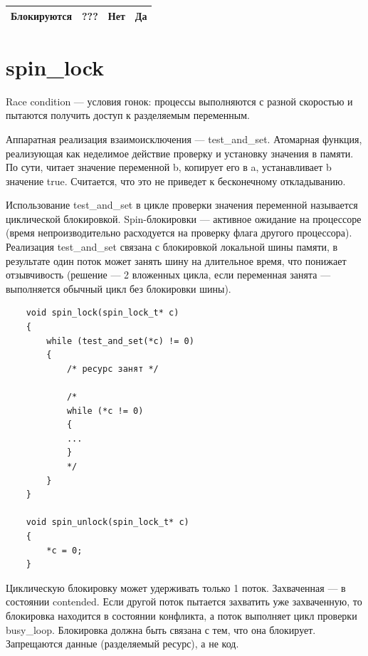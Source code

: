 \begin{table}[]
\begin{center}
\begin{tabular}{|c|l|l|l|}
Блокируются                                                         & ???                                                                                        & Нет                                                                                             & Да                                                                                       \\ \hline
\end{tabular}
\end{center}
\end{table}

\section{spin\_lock}

Race condition --- условия гонок: процессы выполняются с разной скоростью и пытаются получить доступ к разделяемым переменным. 

Аппаратная реализация взаимоисключения --- test\_and\_set. Атомарная функция, реализующая как неделимое действие проверку и установку значения в памяти. По сути, читает значение переменной b, копирует его в a, устанавливает b значение true. Считается, что это не приведет к бесконечному откладыванию. 

Использование test\_and\_set в цикле проверки значения переменной называется циклической блокировкой. Spin-блокировки --- активное ожидание на процессоре (время непроизводительно расходуется на проверку флага другого процессора). Реализация test\_and\_set связана с блокировкой локальной шины памяти, в результате один поток может занять шину на длительное время, что понижает отзывчивость (решение --- 2 вложенных цикла, если переменная занята --- выполняется обычный цикл без блокировки шины).

\begin{lstlisting}
	void spin_lock(spin_lock_t* c)
	{
		while (test_and_set(*c) != 0)
		{
			/* ресурс занят */
			
			/*
			while (*c != 0) 
			{
			...
			}
			*/
		}
	}
	
	void spin_unlock(spin_lock_t* c)
	{
		*c = 0;
	}
\end{lstlisting}

Циклическую блокировку может удерживать только 1 поток. Захваченная --- в состоянии contended. Если другой поток пытается захватить уже захваченную, то блокировка находится в состоянии конфликта, а поток выполняет цикл проверки busy\_loop. Блокировка должна быть связана с тем, что она блокирует. Запрещаются данные (разделяемый ресурс), а не код.

